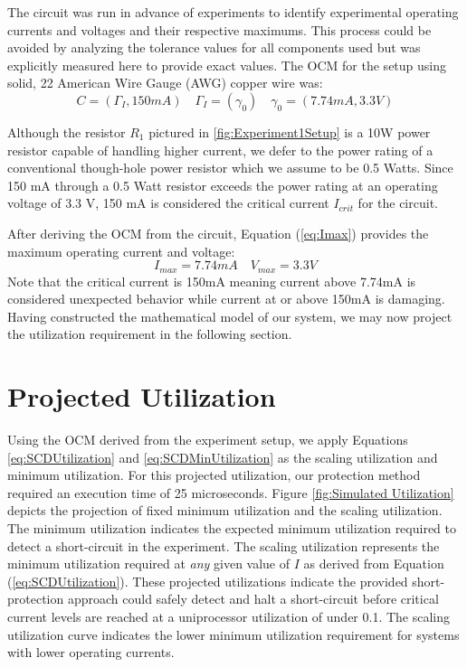 \documentclass[11pt,oneside]{report}
\begin{document}
    The circuit was run in advance of experiments to identify experimental operating currents and voltages and their respective maximums. This process could be avoided by analyzing the tolerance values for all components used but was explicitly measured here to provide exact values. The OCM for the setup using solid, 22 American Wire Gauge (AWG) copper wire was:
    \begin{equation}\label{eq:OCMSetup}
    C = (\Gamma_{I}, 150mA) \quad \Gamma_{I} = (\gamma_{0}) \quad \gamma_{0} = (7.74mA, 3.3V) \nonumber
    \end{equation}
    
    Although the resistor $R_{1}$ pictured in \ref{fig:Experiment1Setup} is a 10W power resistor capable of handling higher current, we defer to the power rating of a conventional though-hole power resistor which we assume to be 0.5 Watts. Since 150 mA through a 0.5 Watt resistor exceeds the power rating at an operating voltage of 3.3 V, 150 mA is considered the critical current $I_{crit}$ for the circuit.
    
    After deriving the OCM from the circuit, Equation (\ref{eq:Imax}) provides the maximum operating current and voltage:
    \begin{equation}
    I_{max} =  7.74mA \nonumber \quad V_{max} = 3.3V \nonumber
    \end{equation}
    Note that the critical current is 150mA meaning current above 7.74mA is considered unexpected behavior while current at or above 150mA is damaging. Having constructed the mathematical model of our system, we may now project the utilization requirement in the following section. 
    
    \section*{Projected Utilization}
    Using the OCM derived from the experiment setup, we apply Equations \ref{eq:SCDUtilization} and \ref{eq:SCDMinUtilization} as the scaling utilization and minimum utilization. For this projected utilization, our protection method required an execution time of 25 microseconds. Figure \ref{fig:Simulated Utilization} depicts the projection of fixed minimum utilization and the scaling utilization. The minimum utilization indicates the expected minimum utilization required to detect a short-circuit in the experiment. The scaling utilization represents the minimum utilization required at \textit{any} given value of $I$ as derived from Equation (\ref{eq:SCDUtilization}). These projected utilizations indicate the provided short-protection approach could safely detect and halt a short-circuit before critical current levels are reached at a uniprocessor utilization of under 0.1. The scaling utilization curve indicates the lower minimum utilization requirement for systems with lower operating currents.
    
\end{document}

